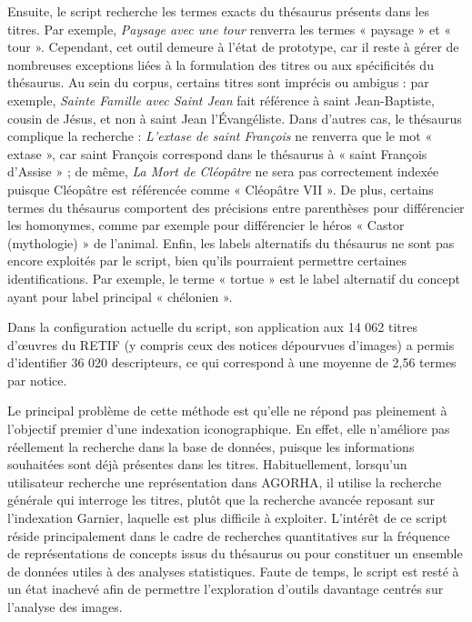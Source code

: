 Ensuite, le script recherche les termes exacts du thésaurus présents dans les titres. Par exemple, \textit{Paysage avec une tour} renverra les termes « paysage » et « tour ». Cependant, cet outil demeure à l’état de prototype, car il reste à gérer de nombreuses exceptions liées à la formulation des titres ou aux spécificités du thésaurus. Au sein du corpus, certains titres sont imprécis ou ambigus : par exemple, \textit{Sainte Famille avec Saint Jean} fait référence à saint Jean-Baptiste, cousin de Jésus, et non à saint Jean l’Évangéliste. Dans d’autres cas, le thésaurus complique la recherche : \textit{L’extase de saint François} ne renverra que le mot « extase », car saint François correspond dans le thésaurus à « saint François d’Assise » ; de même, \textit{La Mort de Cléopâtre} ne sera pas correctement indexée puisque Cléopâtre est référencée comme « Cléopâtre VII ». De plus, certains termes du thésaurus comportent des précisions entre parenthèses pour différencier les homonymes, comme par exemple pour différencier le héros « Castor (mythologie) » de l’animal. Enfin, les labels alternatifs du thésaurus ne sont pas encore exploités par le script, bien qu’ils pourraient permettre certaines identifications. Par exemple, le terme « tortue » est le label alternatif du concept ayant pour label principal « chélonien ».

Dans la configuration actuelle du script, son application aux 14 062 titres d’œuvres du RETIF (y compris ceux des notices dépourvues d’images) a permis d’identifier 36 020 descripteurs, ce qui correspond à une moyenne de 2,56 termes par notice.

Le principal problème de cette méthode est qu’elle ne répond pas pleinement à l’objectif premier d’une indexation iconographique. En effet, elle n’améliore pas réellement la recherche dans la base de données, puisque les informations souhaitées sont déjà présentes dans les titres. Habituellement, lorsqu’un utilisateur recherche une représentation dans AGORHA, il utilise la recherche générale qui interroge les titres, plutôt que la recherche avancée reposant sur l’indexation Garnier, laquelle est plus difficile à exploiter. L’intérêt de ce script réside principalement dans le cadre de recherches quantitatives sur la fréquence de représentations de concepts issus du thésaurus ou pour constituer un ensemble de données utiles à des analyses statistiques. Faute de temps, le script est resté à un état inachevé afin de permettre l’exploration d’outils davantage centrés sur l’analyse des images.
